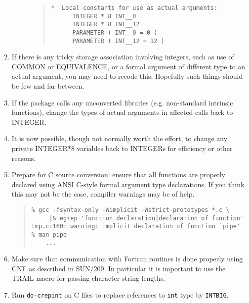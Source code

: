 \documentclass[twoside,11pt]{article}
\newcommand{\htmlref}[2]{#1}
\newcommand{\html}[1]{}
\newcommand{\xref}[3]{#1}
\renewcommand{\_}{\texttt{\symbol{95}}}
\newcommand{\xdofilter}[1]{\htmlref{{\tt do-#1}}{do-xxx}}
\newcommand{\cc}[1]{{\tt #1}}
\newenvironment{squote}{\begin{quote}\begin{small}}{\end{small}\end{quote}}
\begin{document}
\begin{enumerate}
\begin{description}
\begin{squote}
\begin{verbatim}
*  Local constants for use as actual arguments:
      INTEGER * 8 INT__0
      INTEGER * 8 INT__12
      PARAMETER ( INT__0 = 0 )
      PARAMETER ( INT__12 = 12 )
\end{verbatim}
\end{squote}
%
\end{description}
%
\item
If there is any tricky storage association involving integers,
such as use of COMMON or EQUIVALENCE, or a formal argument of
different type to an actual argument, you may need to recode this.
Hopefully such things should be few and far between.
\html{\begin{squote}\end{squote}}
%
\item
If the package calls any unconverted libraries 
(e.g. non-standard intrinsic functions), change the types of
actual arguments in affected calls back to INTEGER.
\html{\begin{squote}\end{squote}}
%
\item
It is now possible, though not normally worth the effort, 
to change any private INTEGER*8 variables back to INTEGERs 
for efficiency or other reasons.
\html{\begin{squote}\end{squote}}
%
\item
Prepare for C source conversion: ensure that all functions are
properly declared using ANSI C-style formal argument type declarations.
If you think this may not be the case, compiler warnings may be of help.
\begin{squote}
\begin{verbatim}
% gcc -fsyntax-only -Wimplicit -Wstrict-prototypes *.c \
     |& egrep 'function declaration|declaration of function'
tmp.c:160: warning: implicit declaration of function `pipe'
% man pipe
    ...
\end{verbatim}
\end{squote}
%
\item
Make sure that communication with Fortran routines is done properly
using CNF as described in \xref{SUN/209}{sun209}{}.
In particular it is important to use the \xref{TRAIL}{sun209}{TRAIL} 
macro for passing character string lengths.
\html{\begin{squote}\end{squote}}
%
\item
Run \xdofilter{crepint} on C files to replace references to \cc{int} type
by \cc{INT\_BIG}.
\begin{squote}

\end{squote}
\end{enumerate}
\end{document}
